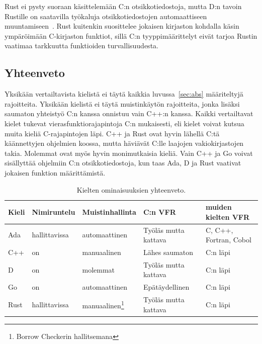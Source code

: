 Rust ei pysty suoraan käsittelemään C:n otsikkotiedostoja, mutta D:n tavoin
Rustille on saatavilla työkaluja otsikkotiedostojen automaattiseen
muuntamiseen~\citep{rustbindgen}. Rust kuitenkin suosittelee jokaisen kirjaston
kohdalla käsin ympäröimään C-kirjaston funktiot, sillä C:n tyyppimäärittelyt
eivät tarjoa Rustin vaatimaa tarkkuutta funktioiden turvallisuudesta.

\newpage

\subsection{Yhteenveto}

Yksikään vertailtavista kielistä ei täytä kaikkia luvussa~\ref{sec:abs}
määriteltyjä rajoitteita. Yksikään kielistä ei täytä muistinkäytön rajoitteita,
jonka lisäksi saumaton yhteistyö C:n kanssa onnistuu vain C++:n
kanssa. Kaikki vertailtavat kielet tukevat vierasfunktiorajapintoja C:n
mukaisesti, eli kielet voivat kutsua muita kieliä C-rajapintojen läpi.
C++ ja Rust ovat hyvin lähellä C:tä käännettyjen ohjelmien koossa, mutta
häviävät C:lle laajojen vakiokirjastojen takia. Molemmat ovat myös hyvin
monimutkaisia kieliä. Vain C++ ja Go voivat sisällyttää ohjelmiin C:n
otsikkotiedostoja, kun taas Ada, D ja Rust vaativat jokaisen funktion
määrittämistä. 

\begin{table}[ht!]
    \begin{adjustbox}{center}
    \begin{tabular}{@{}lllll@{}} \toprule
        Kieli & Nimiruntelu   & Muistinhallinta                                     & C:n VFR               & muiden kielten VFR \\ \midrule
        Ada   & hallittavissa & automaattinen                                       & Työläs mutta kattava  & C, C++, Fortran, Cobol \\
        C++   & on            & manuaalinen                                         & Lähes saumaton        & C:n läpi \\
        D     & on            & molemmat                                            & Työläs mutta kattava  & C:n läpi \\
        Go    & on            & automaattinen                                       & Epätäydellinen        & C:n läpi \\
        Rust  & hallittavissa & manuaalinen\footnote{Borrow Checkerin hallitsemana} & Työläs mutta kattava  & C:n läpi \\ \bottomrule
    \end{tabular}
    \end{adjustbox}
    \caption{
        Kielten ominaisuuksien yhteenveto.
    }
    \label{table:properties}
\end{table}

